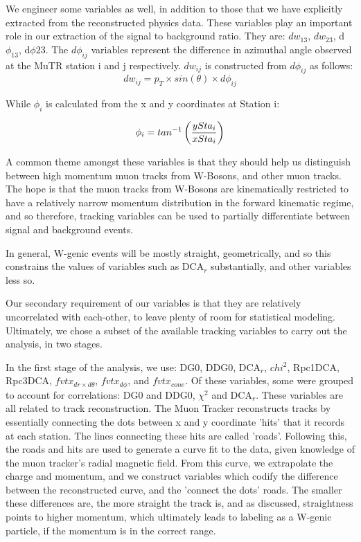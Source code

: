 We engineer some variables as well, in addition to those that we have explicitly
extracted from the reconstructed physics data. These variables play an important
role in our extraction of the signal to background ratio. They are: $dw_{13}$,
$dw_{23}$, d$\phi_{13}$, d$\phi{23}$. The $d\phi_{ij}$ variables represent the
difference in azimuthal angle observed at the MuTR station i and j respectively.
$dw_{ij}$ is constructed from $d\phi_{ij}$ as follows:
\begin{equation}
  dw_{ij} = p_T \times sin(\theta) \times d\phi_{ij}
  \label{eq:dw23_definition}
\end{equation}

While $\phi_{i}$ is calculated from the x and y coordinates at Station i:

\begin{equation}
  \phi_i = tan^{-1}\left({ySta_i \over xSta_i}\right)
  \label{eq:phi_definition}
\end{equation}

A common theme amongst these variables is that they should help us distinguish
between high momentum muon tracks from W-Bosons, and other muon tracks. The hope
is that the muon tracks from W-Bosons are kinematically restricted to have a
relatively narrow momentum distribution in the forward kinematic regime, and so
therefore, tracking variables can be used to partially differentiate between
signal and background events.

In general, W-genic events will be mostly straight, geometrically, and so this
constrains the values of variables such as DCA${}_r$ substantially, and other
variables less so.

Our secondary requirement of our variables is that they are relatively
uncorrelated with each-other, to leave plenty of room for statistical modeling.
Ultimately, we chose a subset of the available tracking variables to carry out
the analysis, in two stages.

In the first stage of the analysis, we use: DG0, DDG0, DCA${}_r$, $chi^2$,
Rpc1DCA, Rpc3DCA, $fvtx_{dr \times d\theta}$, $fvtx_{d\phi}$, and $fvtx_{cone}$.
Of these variables, some were grouped to account for correlations: DG0 and DDG0,
$\chi^2$ and DCA${}_r$. These variables are all related to track reconstruction.
The Muon Tracker reconstructs tracks by essentially connecting the dots between
x and y coordinate 'hits' that it records at each station. The lines connecting
these hits are called 'roads'. Following this, the roads and hits are used to
generate a curve fit to the data, given knowledge of the muon tracker's radial
magnetic field. From this curve, we extrapolate the charge and momentum, and we
construct variables which codify the difference between the reconstructed curve,
and the 'connect the dots' roads. The smaller these differences are, the more
straight the track is, and as discussed, straightness points to higher momentum,
which ultimately leads to labeling as a W-genic particle, if the momentum is in
the correct range.

